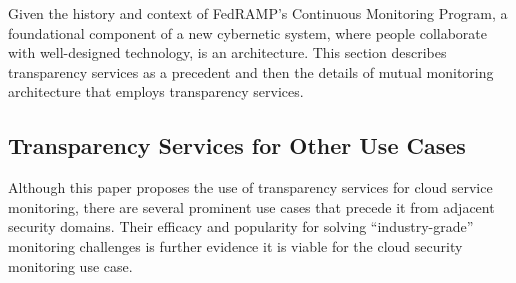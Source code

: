 \documentclass{jdf}
\begin{document}
Given the history and context of FedRAMP's Continuous Monitoring Program, a foundational component of a new cybernetic system, where people collaborate with well-designed technology, is an architecture. This section describes transparency services as a precedent and then the details of mutual monitoring architecture that employs transparency services.

\subsection{Transparency Services for Other Use Cases}

Although this paper proposes the use of transparency services for cloud service monitoring, there are several prominent use cases that precede it from adjacent security domains. Their efficacy and popularity for solving ``industry-grade'' monitoring challenges is further evidence it is viable for the cloud security monitoring use case.
\end{document}
